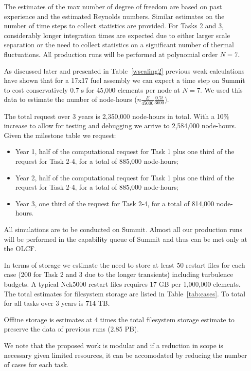 \documentclass[11pt,letterpaper,english]{article}
\begin{document}
The estimates of the max number of degree of freedom are based  on past
experience and the estimated Reynolds numbers. Similar estimates on the number
of time steps to collect statistics are provided. For Tasks 2 and 3,
considerably longer integration times are expected due to either larger scale
separation or the need to collect statistics on a significant number of thermal
fluctuations. All production runs will be performed at polynomial order $N=7$.

As discussed later and presented in Table~\ref{wscaling2} previous weak
calculations have shown that for a 17x17 fuel assembly we can expect a time
step on Summit to cost conservatively 0.7 s for 45,000 elements per node at $N=7$. We
used this data to estimate the number of node-hours
($n\frac{E}{45000}\frac{0.7t}{3600}$).

The total request over 3 years is 2,350,000 node-hours in total. With a 10\% increase to allow for testing and debugging we arrive to 2,584,000 node-hours. Given the milestone table we request:
\begin{itemize}
    \item Year 1, half of the computational request for Task 1 plus one third of the request for Task 2-4, for a total of 885,000 node-hours;
    \item Year 2, half of the computational request for Task 1 plus one third of the request for Task 2-4, for a total of 885,000 node-hours;
    \item Year 3, one third of the request for Task 2-4, for a total of 814,000 node-hours.
\end{itemize}
All simulations are to be conducted on Summit. Almost all our production runs will be performed in the capability queue of Summit and thus can be met only at the OLCF.

In terms of storage we estimate the need to store at least 50 restart files for each case (200 for Task 2 and 3 due to the longer transients) including turbulence budgets. A typical Nek5000 restart files requires 17 GB per 1,000,000 elements. The total estimates for filesystem storage are listed in Table~\ref{tab:cases}. To total for all tasks over 3 years is 714 TB.

Offline storage is estimates at 4 times the total filesystem storage estimate to preserve the  data of previous runs (2.85 PB).

We note that the proposed work is modular and if a reduction in scope is necessary given limited resources,  it can be accomodated by reducing the number of cases for each task.
\end{document}
